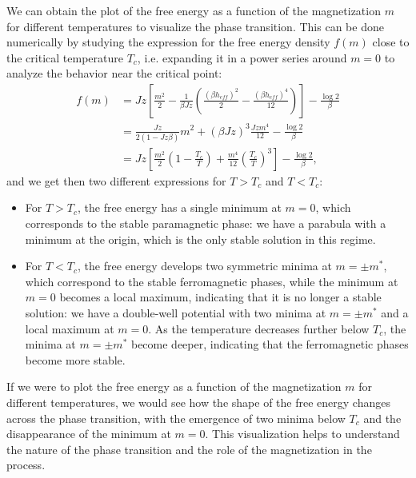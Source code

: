 We can obtain the plot of the free energy as a function of the magnetization \(m\) for different temperatures to visualize the phase transition. This can be done numerically by studying the expression for the free energy density \(f(m)\) close to the critical temperature \(T_c\), i.e. expanding it in a power series around \(m = 0\) to analyze the behavior near the critical point:
\[
    \begin{aligned}
        f(m) & = Jz \left[\frac{m^2}{2} - \frac{1}{\beta J z}\left( \frac{(\beta h_{eff})^2}{2} - \frac{(\beta h_{eff})^4}{12} \right)\right] - \frac{\log 2}{\beta} \\
             & = \frac{Jz}{2 \left(1 - Jz \beta\right)} m^2 + (\beta J z)^3 \frac{Jz m^4}{12} - \frac{\log 2}{\beta}                                                 \\
             & = Jz \left[ \frac{m^2}{2} \left(1 - \frac{T_c}{T}\right) + \frac{m^4}{12}\left(\frac{T_c}{T}\right)^3 \right] - \frac{\log 2}{\beta},
    \end{aligned}
\]
and we get then two different expressions for \(T > T_c\) and \(T < T_c\):
\begin{itemize}
    \item For \(T > T_c\), the free energy has a single minimum at \(m = 0\), which corresponds to the stable paramagnetic phase: we have a parabula with a minimum at the origin, which is the only stable solution in this regime.
    \item For \(T < T_c\), the free energy develops two symmetric minima at \(m = \pm m^*\), which correspond to the stable ferromagnetic phases, while the minimum at \(m = 0\) becomes a local maximum, indicating that it is no longer a stable solution: we have a double-well potential with two minima at \(m = \pm m^*\) and a local maximum at \(m = 0\). As the temperature decreases further below \(T_c\), the minima at \(m = \pm m^*\) become deeper, indicating that the ferromagnetic phases become more stable.
\end{itemize}
If we were to plot the free energy as a function of the magnetization \(m\) for different temperatures, we would see how the shape of the free energy changes across the phase transition, with the emergence of two minima below \(T_c\) and the disappearance of the minimum at \(m = 0\). This visualization helps to understand the nature of the phase transition and the role of the magnetization in the process.

